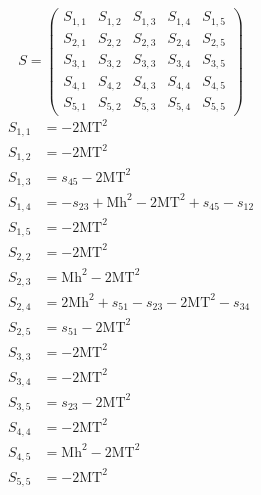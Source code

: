 \documentclass[a4paper]{article}
\begin{document}
\begin{equation}
S=\left(\begin{array}{ccccc}
   S_{1,1}&
   S_{1,2}&
   S_{1,3}&
   S_{1,4}&
   S_{1,5}\\
   S_{2,1}&
   S_{2,2}&
   S_{2,3}&
   S_{2,4}&
   S_{2,5}\\
   S_{3,1}&
   S_{3,2}&
   S_{3,3}&
   S_{3,4}&
   S_{3,5}\\
   S_{4,1}&
   S_{4,2}&
   S_{4,3}&
   S_{4,4}&
   S_{4,5}\\
   S_{5,1}&
   S_{5,2}&
   S_{5,3}&
   S_{5,4}&
   S_{5,5}\end{array}\right)
\end{equation}
\begin{subequations}
\begin{align}
   S_{1,1}&=-2\text{MT}^2\\
   S_{1,2}&=-2\text{MT}^2\\
   S_{1,3}&=s_{45}-2\text{MT}^2\\
   S_{1,4}&=-s_{23}+\text{Mh}^2-2\text{MT}^2+s_{45}-s_{12}\\
   S_{1,5}&=-2\text{MT}^2\\
   S_{2,2}&=-2\text{MT}^2\\
   S_{2,3}&=\text{Mh}^2-2\text{MT}^2\\
   S_{2,4}&=2\text{Mh}^2+s_{51}-s_{23}-2\text{MT}^2-s_{34}\\
   S_{2,5}&=s_{51}-2\text{MT}^2\\
   S_{3,3}&=-2\text{MT}^2\\
   S_{3,4}&=-2\text{MT}^2\\
   S_{3,5}&=s_{23}-2\text{MT}^2\\
   S_{4,4}&=-2\text{MT}^2\\
   S_{4,5}&=\text{Mh}^2-2\text{MT}^2\\
   S_{5,5}&=-2\text{MT}^2
\end{align}
\end{subequations}
\end{document}
